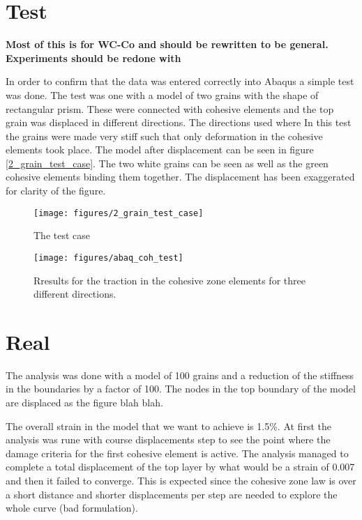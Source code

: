 \documentclass[wcco.tex]{subfiles}
\begin{document}
\section{Test}

\textbf{Most of this is for WC-Co and should be rewritten to be general. Experiments should be redone with }

In order to confirm that the data was entered correctly into Abaqus a simple test was done. The test was one with a model of two grains with the shape of rectangular prism. These were connected with cohesive elements and the top grain was displaced in different directions. The directions used where  In this test the grains were made very stiff such that only deformation in the cohesive elements took place. The model after displacement can be seen in figure \ref{2_grain_test_case}. The two white grains can be seen as well as the green cohesive elements binding them together. The displacement has been exaggerated for clarity of the figure.

\begin{figure}[ht]
\centering
\texttt{[image: figures/2\_grain\_test\_case]}
\caption{The test case}
\label{fig:test_case}
\end{figure}


\begin{figure}[ht]
\centering
\texttt{[image: figures/abaq\_coh\_test]}
\caption{Rresults for the traction in the cohesive zone elements for three different directions.}
\label{fig:test_case}
\end{figure}

\section{Real}
The analysis was done with a model of 100 grains and a reduction of the stiffness in the boundaries by a factor of 100. The nodes in the top boundary of the model are displaced as the figure blah blah.

The overall strain in the model that we want to achieve is 1.5\%. At first the analysis was rune with course displacements step to see the point where the damage criteria for the first cohesive element is active. The analysis managed to complete a total displacement of the top layer by what would be a strain of 0.007 and then it failed to converge. This is expected since the cohesive zone law is over a short distance and shorter displacements per step are needed to explore the whole curve (bad formulation).
\end{document}
